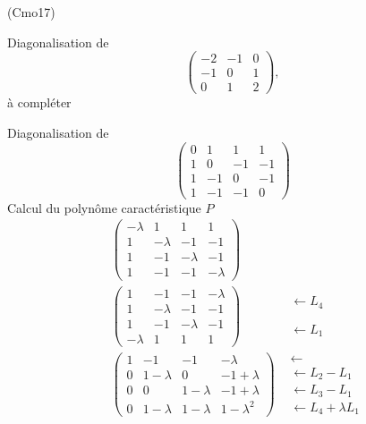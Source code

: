 \begin{tiny}(Cmo17)\end{tiny} Diagonalisation de 
\[
  \begin{pmatrix}
  -2 & -1 & 0 \\ -1 & 0 & 1 \\ 0 & 1 & 2
\end{pmatrix},
\]
à compléter\newline

Diagonalisation de
\[
\begin{pmatrix}
  0 & 1 & 1 & 1 \\ 1 & 0 & -1 & -1\\ 1 & -1 & 0 & -1 \\ 1 & -1 & -1 & 0
\end{pmatrix}
\]
Calcul du polynôme caractéristique $P$
\begin{align*}
&\begin{pmatrix}
  -\lambda & 1 & 1 & 1 \\ 1 & -\lambda & -1 & -1\\ 1 & -1 & -\lambda & -1 \\ 1 & -1 & -1 & -\lambda
\end{pmatrix}& \\
&\begin{pmatrix}
  1 & -1 & -1 & -\lambda \\
  1 & -\lambda & -1 & -1\\
  1 & -1 & -\lambda & -1 \\
  -\lambda & 1 & 1 & 1
\end{pmatrix}&
\begin{aligned}
  \leftarrow L_4 \\  \\  \\ \leftarrow L_1
\end{aligned}
\\
&\begin{pmatrix}
  1 & -1        & -1        & -\lambda     \\
  0 & 1-\lambda & 0         & -1 + \lambda \\
  0 & 0         & 1-\lambda & -1+\lambda   \\
  0 & 1-\lambda & 1-\lambda & 1-\lambda^2
\end{pmatrix}&
\begin{aligned}
 \leftarrow  \\ \leftarrow L_2 - L_1\\ \leftarrow L_3 - L_1 \\ \leftarrow L_4 + \lambda L_1

\end{aligned}
\end{align*}
